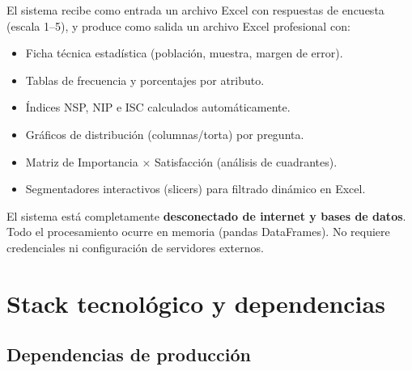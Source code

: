 \documentclass[12pt, letterpaper]{article}
\begin{document}
El sistema recibe como entrada un archivo Excel con respuestas de encuesta (escala 1--5), y produce como salida un archivo Excel profesional con:

\begin{itemize}[leftmargin=1.5cm]
  \item Ficha técnica estadística (población, muestra, margen de error).
  \item Tablas de frecuencia y porcentajes por atributo.
  \item Índices NSP, NIP e ISC calculados automáticamente.
  \item Gráficos de distribución (columnas/torta) por pregunta.
  \item Matriz de Importancia × Satisfacción (análisis de cuadrantes).
  \item Segmentadores interactivos (slicers) para filtrado dinámico en Excel.
\end{itemize}

\begin{notadev}
El sistema está completamente \textbf{desconectado de internet y bases de datos}. Todo el procesamiento ocurre en memoria (pandas DataFrames). No requiere credenciales ni configuración de servidores externos.
\end{notadev}

\section{Stack tecnológico y dependencias}

\subsection{Dependencias de producción}
\end{document}

